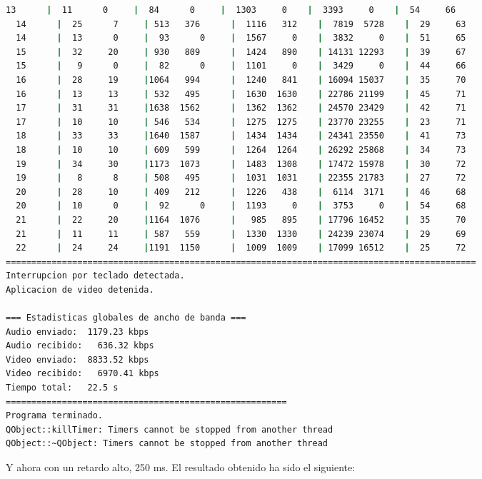 \begin{adjustbox}{max width=\textwidth}
\begin{lstlisting}[language=bash,basicstyle=\ttfamily\scriptsize]
  13      |  11      0     |  84      0     |  1303     0    |  3393     0    |  54     66
  14      |  25      7     | 513   376      |  1116   312    |  7819  5728    |  29     63
  14      |  13      0     |  93      0     |  1567     0    |  3832     0    |  51     65
  15      |  32     20     | 930   809      |  1424   890    | 14131 12293    |  39     67
  15      |   9      0     |  82      0     |  1101     0    |  3429     0    |  44     66
  16      |  28     19     |1064   994      |  1240   841    | 16094 15037    |  35     70
  16      |  13     13     | 532   495      |  1630  1630    | 22786 21199    |  45     71
  17      |  31     31     |1638  1562      |  1362  1362    | 24570 23429    |  42     71
  17      |  10     10     | 546   534      |  1275  1275    | 23770 23255    |  23     71
  18      |  33     33     |1640  1587      |  1434  1434    | 24341 23550    |  41     73
  18      |  10     10     | 609   599      |  1264  1264    | 26292 25868    |  34     73
  19      |  34     30     |1173  1073      |  1483  1308    | 17472 15978    |  30     72
  19      |   8      8     | 508   495      |  1031  1031    | 22355 21783    |  27     72
  20      |  28     10     | 409   212      |  1226   438    |  6114  3171    |  46     68
  20      |  10      0     |  92      0     |  1193     0    |  3753     0    |  54     68
  21      |  22     20     |1164  1076      |   985   895    | 17796 16452    |  35     70
  21      |  11     11     | 587   559      |  1330  1330    | 24239 23074    |  29     69
  22      |  24     24     |1191  1150      |  1009  1009    | 17099 16512    |  25     72
============================================================================================
Interrupcion por teclado detectada.
Aplicacion de video detenida.

=== Estadisticas globales de ancho de banda ===
Audio enviado:	1179.23 kbps
Audio recibido:   636.32 kbps
Video enviado:	8833.52 kbps
Video recibido:   6970.41 kbps
Tiempo total: 	22.5 s
=======================================================
Programa terminado.
QObject::killTimer: Timers cannot be stopped from another thread
QObject::~QObject: Timers cannot be stopped from another thread
\end{lstlisting}
\end{adjustbox}
\vspace{\baselineskip}

\newpage

Y ahora con un retardo alto, 250 ms. El resultado obtenido ha sido el siguiente:
\vspace{\baselineskip}


